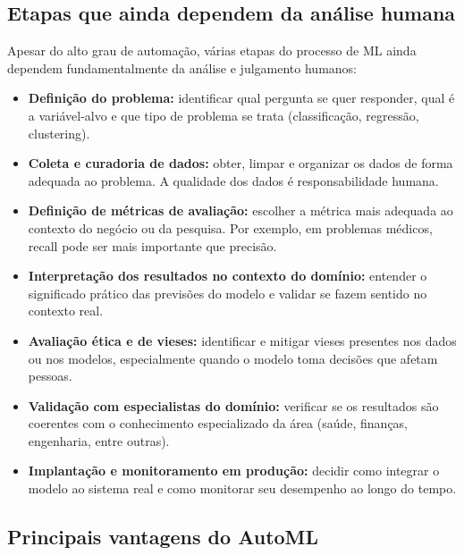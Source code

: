 \documentclass[11pt, a4paper, oneside]{article}
\begin{document}
\subsection{Etapas que ainda dependem da análise humana}
\label{sec:etapas-humanas}

Apesar do alto grau de automação, várias etapas do processo de ML ainda dependem
fundamentalmente da análise e julgamento humanos:

\begin{itemize}[leftmargin=1.5cm, itemsep=4pt]
  \item \textbf{Definição do problema:} identificar qual pergunta se quer responder, qual é a variável-alvo e que tipo de problema se trata (classificação, regressão, clustering).
  \item \textbf{Coleta e curadoria de dados:} obter, limpar e organizar os dados de forma adequada ao problema. A qualidade dos dados é responsabilidade humana.
  \item \textbf{Definição de métricas de avaliação:} escolher a métrica mais adequada ao contexto do negócio ou da pesquisa. Por exemplo, em problemas médicos, recall pode ser mais importante que precisão.
  \item \textbf{Interpretação dos resultados no contexto do domínio:} entender o significado prático das previsões do modelo e validar se fazem sentido no contexto real.
  \item \textbf{Avaliação ética e de vieses:} identificar e mitigar vieses presentes nos dados ou nos modelos, especialmente quando o modelo toma decisões que afetam pessoas.
  \item \textbf{Validação com especialistas do domínio:} verificar se os resultados são coerentes com o conhecimento especializado da área (saúde, finanças, engenharia, entre outras).
  \item \textbf{Implantação e monitoramento em produção:} decidir como integrar o modelo ao sistema real e como monitorar seu desempenho ao longo do tempo.
\end{itemize}

\subsection{Principais vantagens do AutoML}
\label{sec:vantagens}
\end{document}
